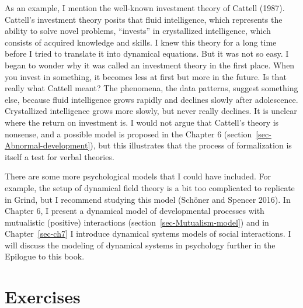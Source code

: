 \documentclass[
  a4paper,
  DIV=11,
  numbers=noendperiod,
  oneside]{scrreprt}
\begin{document}
As an example, I mention the well-known investment theory of Cattell
(1987). Cattell's investment theory posits that fluid intelligence,
which represents the ability to solve novel problems, ``invests'' in
crystallized intelligence, which consists of acquired knowledge and
skills. I knew this theory for a long time before I tried to translate
it into dynamical equations. But it was not so easy. I began to wonder
why it was called an investment theory in the first place. When you
invest in something, it becomes less at first but more in the future. Is
that really what Cattell meant? The phenomena, the data patterns,
suggest something else, because fluid intelligence grows rapidly and
declines slowly after adolescence. Crystallized intelligence grows more
slowly, but never really declines. It is unclear where the return on
investment is. I would not argue that Cattell's theory is nonsense, and
a possible model is proposed in the Chapter 6
(section~\ref{sec-Abnormal-development}), but this illustrates that the
process of formalization is itself a test for verbal theories.

There are some more psychological models that I could have included. For
example, the setup of dynamical field theory is a bit too complicated to
replicate in Grind, but I recommend studying this model (Schöner and
Spencer 2016). In Chapter 6, I present a dynamical model of
developmental processes with mutualistic (positive) interactions
(section~\ref{sec-Mutualism-model}) and in Chapter~\ref{sec-ch7} I
introduce dynamical systems models of social interactions. I will
discuss the modeling of dynamical systems in psychology further in the
Epilogue to this book.

\section{Exercises}\label{sec-Exercises-ch4n}
\end{document}
